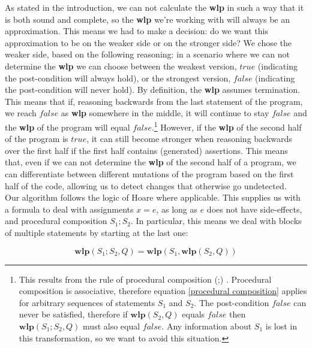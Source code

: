 \documentclass[a4paper, fleqn]{article}
\newcommand{\wlp}{\textbf{wlp}\xspace}
\begin{document}
As stated in the introduction, we can not calculate the \wlp in such a way that it is both sound and complete, so the \wlp we're working with will always be an approximation. This means we had to make a decision: do we want this approximation to be on the weaker side or on the stronger side? We chose the weaker side, based on the following reasoning: in a scenario where we can not determine the \wlp we can choose between the weakest version, $true$ (indicating the post-condition will always hold), or the strongest version, $false$ (indicating the post-condition will never hold). By definition, the \wlp assumes termination. This means that if, reasoning backwards from the last statement of the program, we reach $false$ as \wlp somewhere in the middle, it will continue to stay $false$ and the \wlp of the program will equal $false$.\footnote{This results from the rule of procedural composition (;) \cite{hoare}. Procedural composition is associative, therefore equation \ref{procedural composition} applies for arbitrary sequences of statements $S_1$ and $S_2$. The post-condition $false$ can never be satisfied, therefore if $\wlp(S_2, Q)$ equals $false$ then $\wlp(S_1;S_2, Q)$ must also equal $false$. Any information about $S_1$ is lost in this transformation, so we want to avoid this situation.} However, if the \wlp of the second half of the program is $true$, it can still become stronger when reasoning backwards over the first half if the first half contains (generated) assertions. This means that, even if we can not determine the \wlp of the second half of a program, we can differentiate between different mutations of the program based on the first half of the code, allowing us to detect changes that otherwise go undetected.
\\
Our algorithm follows the logic of Hoare \cite{hoare} where applicable. This supplies us with a formula to deal with assignments $x = e$, as long as $e$ does not have side-effects, and procedural composition $S_1;S_2$. In particular, this means we deal with blocks of multiple statements by starting at the last one:

\begin{equation}
\wlp(S_1;S_2, Q) = \wlp(S_1,\wlp(S_2, Q))
\label{procedural composition}
\end{equation}
\end{document}
